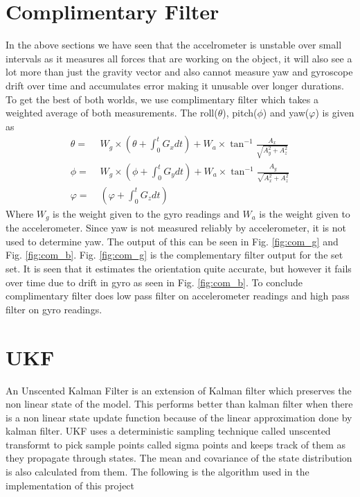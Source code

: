 \documentclass[fleqn,10pt]{SelfArx} %
\begin{document}
\section{Complimentary Filter}
\label{sec:comp}
In the above sections we have seen that the accelrometer is unstable over small intervals as it measures all forces that are working on the object, it will also see a lot more than just the gravity vector and also cannot measure yaw and gyroscope drift over time and accumulates error making it unusable over longer durations. To get the best of both worlds, we use complimentary filter which takes a weighted average of both measurements. The roll($\theta$), pitch($\phi$) and yaw($\varphi$) is given as
\begin{align*}
\theta =&\; W_g \times (\theta + \int_{0}^{t}G_x dt) + W_a \times \tan^{-1} \frac{A_x}{\sqrt{A_y^2+A_z^2}} \\
\phi =&\; W_g \times (\phi + \int_{0}^{t}G_y dt) + W_a \times \tan^{-1} \frac{A_y}{\sqrt{A_x^2+A_z^2}}\\
\varphi =&\; (\varphi + \int_{0}^{t}G_z dt)
\end{align*}
Where $W_g$ is the weight given to the gyro readings and $W_a$ is the weight given to the accelerometer. Since yaw is not measured reliably by accelerometer, it is not used to determine yaw. The output of this can be seen in Fig. \ref{fig:com_g} and Fig. \ref{fig:com_b}. Fig. \ref{fig:com_g} is the complementary filter output for the set set. It is seen that it estimates the orientation quite accurate, but however it fails over time due to drift in gyro as seen in Fig. \ref{fig:com_b}. To conclude complimentary filter does low pass filter on accelerometer readings and high pass filter on gyro readings.

\section{UKF}
\label{sec:ukf}
An Unscented Kalman Filter is an extension of Kalman filter which preserves the non linear state of the model. This performs better than kalman filter when there is a non linear state update function because of the linear approximation done by kalman filter. UKF uses a deterministic sampling technique called unscented transformt to pick sample points called sigma points and keeps track of them as they propagate through states. The mean and covariance of the state distribution is also calculated from them. The following is the algorithm used in the implementation of this project
\end{document}
